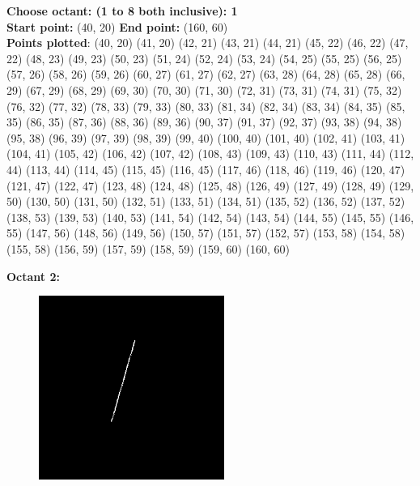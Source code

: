 \documentclass[12pt,letterpaper]{article}
\begin{document}
\textbf{Choose octant: (1 to 8 both inclusive): 1}\\
\textbf{Start point:} (40, 20)
\textbf{End point:} (160, 60)\\
\textbf{Points plotted}: 
(40, 20) (41, 20) (42, 21) (43, 21) 
(44, 21) (45, 22) (46, 22) (47, 22) 
(48, 23) (49, 23) (50, 23) (51, 24) 
(52, 24) (53, 24) (54, 25) (55, 25) 
(56, 25) (57, 26) (58, 26) (59, 26) 
(60, 27) (61, 27) (62, 27) (63, 28) 
(64, 28) (65, 28) (66, 29) (67, 29) 
(68, 29) (69, 30) (70, 30) (71, 30) 
(72, 31) (73, 31) (74, 31) (75, 32) 
(76, 32) (77, 32) (78, 33) (79, 33) 
(80, 33) (81, 34) (82, 34) (83, 34) 
(84, 35) (85, 35) (86, 35) (87, 36) 
(88, 36) (89, 36) (90, 37) (91, 37) 
(92, 37) (93, 38) (94, 38) (95, 38) 
(96, 39) (97, 39) (98, 39) (99, 40) 
(100, 40) (101, 40) (102, 41) (103, 41) 
(104, 41) (105, 42) (106, 42) (107, 42) 
(108, 43) (109, 43) (110, 43) (111, 44) 
(112, 44) (113, 44) (114, 45) (115, 45) 
(116, 45) (117, 46) (118, 46) (119, 46) 
(120, 47) (121, 47) (122, 47) (123, 48) 
(124, 48) (125, 48) (126, 49) (127, 49) 
(128, 49) (129, 50) (130, 50) (131, 50) 
(132, 51) (133, 51) (134, 51) (135, 52) 
(136, 52) (137, 52) (138, 53) (139, 53) 
(140, 53) (141, 54) (142, 54) (143, 54) 
(144, 55) (145, 55) (146, 55) (147, 56) 
(148, 56) (149, 56) (150, 57) (151, 57) 
(152, 57) (153, 58) (154, 58) (155, 58) 
(156, 59) (157, 59) (158, 59) (159, 60) 
(160, 60) 

\newpage
\textbf{Octant 2:}
\begin{figure}[h]
    \centering
    \includegraphics[height=6cm]{Outputs/O2-1.png}
\end{figure}
\end{document}
